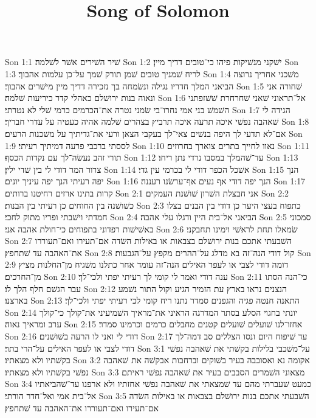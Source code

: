 

\title{Song of Solomon}

Son 1:1  שׁיר השׁירים אשׁר לשׁלמה׃
Son 1:2  ישׁקני מנשׁיקות פיהו כי־טובים דדיך מיין׃
Son 1:3  לריח שׁמניך טובים שׁמן תורק שׁמך על־כן עלמות אהבוך׃
Son 1:4  משׁכני אחריך נרוצה הביאני המלך חדריו נגילה ונשׂמחה בך נזכירה דדיך מיין מישׁרים אהבוך׃
Son 1:5  שׁחורה אני ונאוה בנות ירושׁלם כאהלי קדר כיריעות שׁלמה׃
Son 1:6  אל־תראוני שׁאני שׁחרחרת שׁשׁזפתני השׁמשׁ בני אמי נחרו־בי שׂמני נטרה את־הכרמים כרמי שׁלי לא נטרתי׃
Son 1:7  הגידה לי שׁאהבה נפשׁי איכה תרעה איכה תרביץ בצהרים שׁלמה אהיה כעטיה על עדרי חבריך׃
Son 1:8  אם־לא תדעי לך היפה בנשׁים צאי־לך בעקבי הצאן ורעי את־גדיתיך על משׁכנות הרעים׃
Son 1:9  לססתי ברכבי פרעה דמיתיך רעיתי׃
Son 1:10  נאוו לחייך בתרים צוארך בחרוזים׃
Son 1:11  תורי זהב נעשׂה־לך עם נקדות הכסף׃
Son 1:12  עד־שׁהמלך במסבו נרדי נתן ריחו׃
Son 1:13  צרור המר דודי לי בין שׁדי ילין׃
Son 1:14  אשׁכל הכפר דודי לי בכרמי עין גדי׃
Son 1:15  הנך יפה רעיתי הנך יפה עיניך יונים׃
Son 1:16  הנך יפה דודי אף נעים אף־ערשׂנו רעננה׃
Son 1:17  קרות בתינו ארזים רחיטנו ברותים׃
Son 2:1  אני חבצלת השׁרון שׁושׁנת העמקים׃
Son 2:2  כשׁושׁנה בין החוחים כן רעיתי בין הבנות׃
Son 2:3  כתפוח בעצי היער כן דודי בין הבנים בצלו חמדתי וישׁבתי ופריו מתוק לחכי׃
Son 2:4  הביאני אל־בית היין ודגלו עלי אהבה׃
Son 2:5  סמכוני באשׁישׁות רפדוני בתפוחים כי־חולת אהבה אני׃
Son 2:6  שׂמאלו תחת לראשׁי וימינו תחבקני׃
Son 2:7  השׁבעתי אתכם בנות ירושׁלם בצבאות או באילות השׂדה אם־תעירו ואם־תעוררו את־האהבה עד שׁתחפץ׃
Son 2:8  קול דודי הנה־זה בא מדלג על־ההרים מקפץ על־הגבעות׃
Son 2:9  דומה דודי לצבי או לעפר האילים הנה־זה עומד אחר כתלנו משׁגיח מן־החלנות מציץ מן־החרכים׃
Son 2:10  ענה דודי ואמר לי קומי לך רעיתי יפתי ולכי־לך׃
Son 2:11  כי־הנה הסתו עבר הגשׁם חלף הלך לו׃
Son 2:12  הנצנים נראו בארץ עת הזמיר הגיע וקול התור נשׁמע בארצנו׃
Son 2:13  התאנה חנטה פגיה והגפנים סמדר נתנו ריח קומי לכי רעיתי יפתי ולכי־לך׃
Son 2:14  יונתי בחגוי הסלע בסתר המדרגה הראיני את־מראיך השׁמיעיני את־קולך כי־קולך ערב ומראיך נאוה׃
Son 2:15  אחזו־לנו שׁועלים שׁועלים קטנים מחבלים כרמים וכרמינו סמדר׃
Son 2:16  דודי לי ואני לו הרעה בשׁושׁנים׃
Son 2:17  עד שׁיפוח היום ונסו הצללים סב דמה־לך דודי לצבי או לעפר האילים על־הרי בתר׃
Son 3:1  על־משׁכבי בלילות בקשׁתי את שׁאהבה נפשׁי בקשׁתיו ולא מצאתיו׃
Son 3:2  אקומה נא ואסובבה בעיר בשׁוקים וברחבות אבקשׁה את שׁאהבה נפשׁי בקשׁתיו ולא מצאתיו׃
Son 3:3  מצאוני השׁמרים הסבבים בעיר את שׁאהבה נפשׁי ראיתם׃
Son 3:4  כמעט שׁעברתי מהם עד שׁמצאתי את שׁאהבה נפשׁי אחזתיו ולא ארפנו עד־שׁהביאתיו אל־בית אמי ואל־חדר הורתי׃
Son 3:5  השׁבעתי אתכם בנות ירושׁלם בצבאות או באילות השׂדה אם־תעירו ואם־תעוררו את־האהבה עד שׁתחפץ׃
